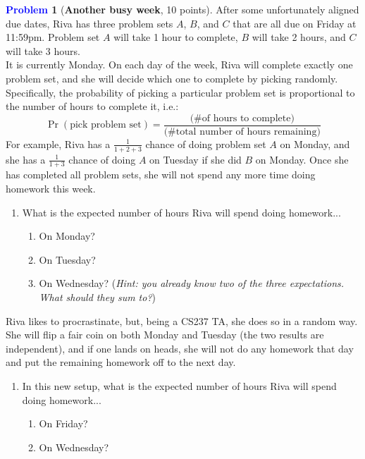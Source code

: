 \documentclass[letterpaper,11pt]{article}
\theoremstyle{plain}
\theoremstyle{definition}
\newtheorem{problem}{\textcolor{blue}{Problem}}
\theoremstyle{plain}
\begin{document}
\begin{problem}[\textbf{Another busy week}, 10 points]
    After some unfortunately aligned due dates, Riva has three problem sets $A$, $B$, and $C$ that are all due on Friday at 11:59pm. Problem set $A$ will take 1 hour to complete, $B$ will take 2 hours, and $C$ will take 3 hours.\\
    
    It is currently Monday. On each day of the week, Riva will complete exactly one problem set, and she will decide which one to complete by picking randomly. Specifically, the probability of picking a particular problem set is proportional to the number of hours to complete it, i.e.:
    $$\Pr(\text{pick problem set}) = \frac {\text{(\# of hours to complete)}} {\text{(\# total number of hours remaining)}}$$
    For example, Riva has a $\frac 1 {1+2+3}$ chance of doing problem set $A$ on Monday, and she has a $\frac 1 {1+3}$ chance of doing $A$ on Tuesday if she did $B$ on Monday. Once she has completed all problem sets, she will not spend any more time doing homework this week.

    \begin{enumerate}[label=(\alph*)]
        \item What is the expected number of hours Riva will spend doing homework...
        \begin{enumerate}[label=(\roman*)]
            \item On Monday?
            \item On Tuesday?
            \item On Wednesday? (\textit{Hint: you already know two of the three expectations. What should they sum to?})
        \end{enumerate}
    \end{enumerate}
    Riva likes to procrastinate, but, being a CS237 TA, she does so in a random way. She will flip a fair coin on both Monday and Tuesday (the two results are independent), and if one lands on heads, she will not do any homework that day and put the remaining homework off to the next day.
    \begin{enumerate}[label=(\alph*),resume]
        \item In this new setup, what is the expected number of hours Riva will spend doing homework...
        \begin{enumerate}[label=(\roman*)]
            \item On Friday?
            \item On Wednesday?
        \end{enumerate}
    \end{enumerate}
\end{problem}
\end{document}
